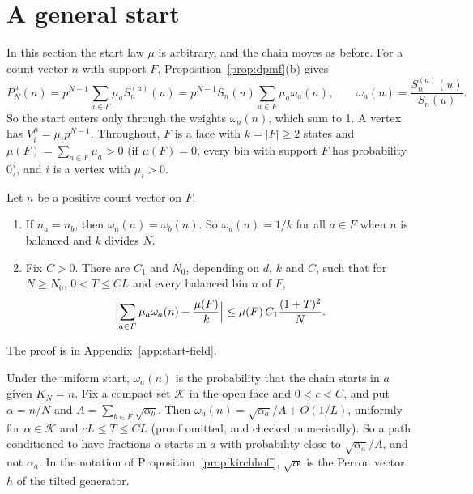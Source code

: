 \section{A general start}\label{sec:general-start}

In this section the start law $\mu$ is arbitrary, and the chain moves as
before. For a count vector $n$ with support $F$, Proposition~\ref{prop:dpmf}(b)
gives
\[
 P^\mu_N(n)=p^{N-1}\sum_{a\in F}\mu_aS^{(a)}_n(u)
 =p^{N-1}S_n(u)\sum_{a\in F}\mu_a\omega_a(n),\qquad
 \omega_a(n)=\frac{S^{(a)}_n(u)}{S_n(u)}.
\]
So the start enters only through the weights $\omega_a(n)$, which sum to 1. A
vertex has $V^\mu_i=\mu_ip^{N-1}$. Throughout, $F$ is a face with $k=|F|\ge2$
states and $\mu(F)=\sum_{a\in F}\mu_a>0$ (if $\mu(F)=0$, every bin with support
$F$ has probability 0), and $i$ is a vertex with $\mu_i>0$.

\begin{lemma}\label{lem:start-weights}
Let $n$ be a positive count vector on $F$.
\begin{enumerate}[(1)]
\item If $n_a=n_b$, then $\omega_a(n)=\omega_b(n)$. So $\omega_a(n)=1/k$ for
all $a\in F$ when $n$ is balanced and $k$ divides $N$.
\item Fix $C>0$. There are $C_1$ and $N_0$, depending on $d$, $k$ and $C$, such that
for $N\ge N_0$, $0<T\le CL$ and every balanced bin $n$ of $F$,
\[
 \Bigl|\sum_{a\in F}\mu_a\omega_a(n)-\frac{\mu(F)}k\Bigr|
 \le\mu(F)\,C_1\frac{(1+T)^2}N.
\]
\end{enumerate}
\end{lemma}

The proof is in Appendix~\ref{app:start-field}.

\begin{remark}\label{rem:start-weights}
Under the uniform start, $\omega_a(n)$ is the probability that the chain starts
in $a$ given $K_N=n$. Fix a compact set $\mathcal K$ in the open face and
$0<c<C$, and put $\alpha=n/N$ and $A=\sum_{b\in F}\sqrt{\alpha_b}$. Then
$\omega_a(n)=\sqrt{\alpha_a}/A+O(1/L)$, uniformly for $\alpha\in\mathcal K$ and
$cL\le T\le CL$ (proof omitted, and checked numerically). So a path
conditioned to have fractions $\alpha$ starts in $a$ with probability close to
$\sqrt{\alpha_a}/A$, and not $\alpha_a$. In the notation of
Proposition~\ref{prop:kirchhoff}, $\sqrt\alpha$ is the Perron vector $h$ of the
tilted generator.
\end{remark}

